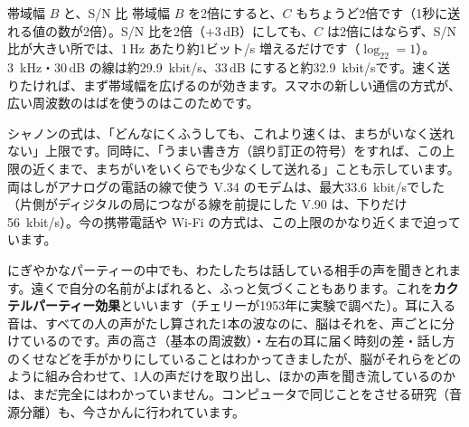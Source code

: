 \begin{bkfigure}
\label{ph:波-11:fig-youryou}
\end{bkfigure}

\begin{phbaisuru}{帯域幅 $B$ と、S/N 比}
帯域幅 $B$ を2倍にすると、$C$ もちょうど2倍です（1秒に送れる値の数が2倍）。S/N 比を2倍（$+3$\,dB）にしても、$C$ は2倍にはならず、S/N 比が大きい所では、1\,Hz あたり約1ビット/s 増えるだけです（$\log_22=1$）。\qty{3}{kHz}・30\,dB の線は約\qty{29.9}{kbit/s}、33\,dB にすると約\qty{32.9}{kbit/s}です。速く送りたければ、まず帯域幅を広げるのが効きます。スマホの新しい通信の方式が、広い周波数のはばを使うのはこのためです。
\end{phbaisuru}

\noindent シャノンの式は、「どんなにくふうしても、これより速くは、まちがいなく送れない」上限です。同時に、「うまい書き方（誤り訂正の符号）をすれば、この上限の近くまで、まちがいをいくらでも少なくして送れる」ことも示しています。両はしがアナログの電話の線で使う V.34 のモデムは、最大\qty{33.6}{kbit/s}でした（片側がディジタルの局につながる線を前提にした V.90 は、下りだけ\qty{56}{kbit/s}）。今の携帯電話や Wi-Fi の方式は、この上限のかなり近くまで迫っています。

\begin{phmada}
にぎやかなパーティーの中でも、わたしたちは話している相手の声を聞きとれます。遠くで自分の名前がよばれると、ふっと気づくこともあります。これを\textbf{カクテルパーティー効果}といいます（チェリーが1953年に実験で調べた）。耳に入る音は、すべての人の声がたし算された1本の波なのに、脳はそれを、声ごとに分けているのです。声の高さ（基本の周波数）・左右の耳に届く時刻の差・話し方のくせなどを手がかりにしていることはわかってきましたが、脳がそれらをどのように組み合わせて、1人の声だけを取り出し、ほかの声を聞き流しているのかは、まだ完全にはわかっていません。コンピュータで同じことをさせる研究（音源分離）も、今さかんに行われています。
\end{phmada}

